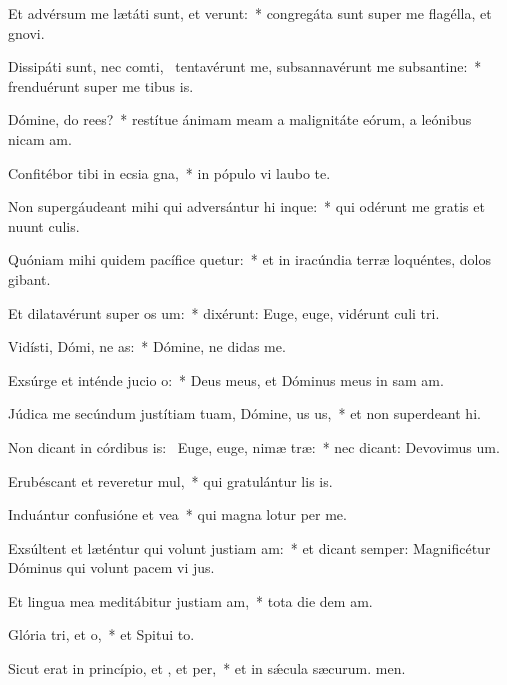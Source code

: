 \item Et advérsum me lætáti sunt, et verunt:~* congregáta sunt super me flagélla, et gnovi.
\item Dissipáti sunt, nec comti,~\pscross{} tentavérunt me, subsannavérunt me subsantine:~* frenduérunt super me tibus is.
\item Dómine, do rees?~* restítue ánimam meam a malignitáte eórum, a leónibus nicam am.
\item Confitébor tibi in ecsia gna,~* in pópulo vi laubo te.
\item Non supergáudeant mihi qui adversántur hi inque:~* qui odérunt me gratis et nuunt culis.
\item Quóniam mihi quidem pacífice quetur:~* et in iracúndia terræ loquéntes, dolos gibant.
\item Et dilatavérunt super  os um:~* dixérunt: Euge, euge, vidérunt culi tri.
\item Vidísti, Dómi, ne as:~* Dómine, ne didas  me.
\item Exsúrge et inténde jucio o:~* Deus meus, et Dóminus meus in sam am.
\item Júdica me secúndum justítiam tuam, Dómine, us us,~* et non superdeant hi.
\item Non dicant in córdibus is:~\pscross{} Euge, euge, nimæ træ:~* nec dicant: Devovimus um.
\item Erubéscant et reveretur mul,~* qui gratulántur lis is.
\item Induántur confusióne et vea~* qui magna lotur per me.
\item Exsúltent et læténtur qui volunt justiam am:~* et dicant semper: Magnificétur Dóminus qui volunt pacem vi jus.
\item Et lingua mea meditábitur justiam am,~* tota die dem am.
\item Glória tri, et o,~* et Spitui to.
\item Sicut erat in princípio, et , et per,~* et in sǽcula sæcurum. men.
